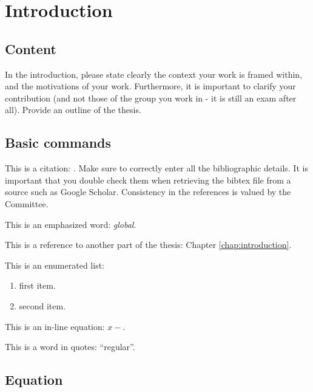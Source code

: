 
\chapter{Introduction}
\label{chap:first}
\ifpdf
    \graphicspath{{Chapter1/Figures/PNG/}{Chapter1/Figures/PDF/}{Chapter1/Figures/}{Chapter1/Figures/EPS/}}
\else
    \graphicspath{{Chapter1/Figures/EPS/}{Chapter1/Figures/}}
\fi


\section{Content}
In the introduction, please state clearly the context your work is framed within, and the motivations of your work. Furthermore, it is important to clarify your contribution (and not those of the group you work in - it is still an exam after all). Provide an outline of the thesis.


\section{Basic commands}
\label{sec:basic_commands}
This is a citation: \cite{Aarzen1999}. Make sure to correctly enter all the bibliographic details. It is important that you double check them when retrieving the bibtex file from a source such as Google Scholar. Consistency in the references is valued by the Committee.

This is an emphasized word: \emph{global}.

This is a reference to another part of the thesis: Chapter \ref{chap:introduction}.

This is an enumerated list:
\begin{enumerate}
\item first item.
\item second item.
\end{enumerate}

This is an in-line equation: $x-$.

This is a word in quotes: ``regular''.

\section{Equation}
\label{sec:equation}

